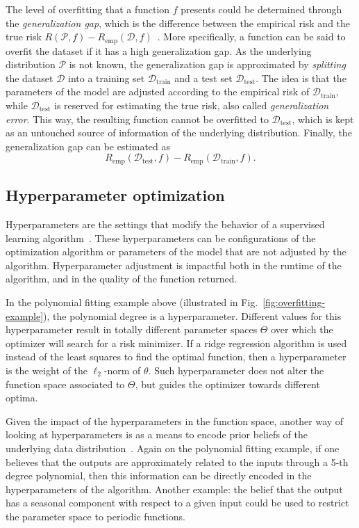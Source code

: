 The level of overfitting that a function $f$ presents could be determined through the \emph{generalization gap}, which is the difference between the empirical risk and the true risk $R(\mathcal{P},f) - R_\textrm{emp}(\mathcal{D},f)$~\cite{murphyMachineLearningProbabilistic2013}.
More specifically, a function can be said to overfit the dataset if it has a high generalization gap.
As the underlying distribution $\mathcal{P}$ is not known, the generalization gap is approximated by \emph{splitting} the dataset $\mathcal{D}$ into a training set $\mathcal{D}_\textrm{train}$ and a test set $\mathcal{D}_\textrm{test}$.
The idea is that the parameters of the model are adjusted according to the empirical risk of $\mathcal{D}_\textrm{train}$, while $\mathcal{D}_\textrm{test}$ is reserved for estimating the true risk, also called \emph{generalization error}.
This way, the resulting function cannot be overfitted to $\mathcal{D}_\textrm{test}$, which is kept as an untouched source of information of the underlying distribution.
Finally, the generalization gap can be estimated as  \[
    R_\textrm{emp}(\mathcal{D}_\textrm{test},f) - R_\textrm{emp}(\mathcal{D}_\textrm{train},f)
.\] 

\subsection{Hyperparameter optimization}

Hyperparameters are the settings that modify the behavior of a supervised learning algorithm~\cite{Goodfellow-et-al-2016}.
These hyperparameters can be configurations of the optimization algorithm or parameters of the model that are not adjusted by the algorithm.
Hyperparameter adjustment is impactful both in the runtime of the algorithm, and in the quality of the function returned.

In the polynomial fitting example above (illustrated in Fig.~\ref{fig:overfitting-example}), the polynomial degree is a hyperparameter.
Different values for this hyperparameter result in totally different parameter spaces $\Theta$ over which the optimizer will search for a risk minimizer.
If a ridge regression algorithm is used instead of the least squares to find the optimal function, then a hyperparameter is the weight of the $\ell_2$-norm of $\theta$.
Such hyperparameter does not alter the function space associated to $\Theta$, but guides the optimizer towards different optima.

Given the impact of the hyperparameters in the function space, another way of looking at hyperparameters is as a means to encode prior beliefs of the underlying data distribution~\cite{murphyMachineLearningProbabilistic2013}.
Again on the polynomial fitting example, if one believes that the outputs are approximately related to the inputs through a 5-th degree polynomial, then this information can be directly encoded in the hyperparameters of the algorithm.
Another example: the belief that the output has a seasonal component with respect to a given input could be used to restrict the parameter space to periodic functions.


